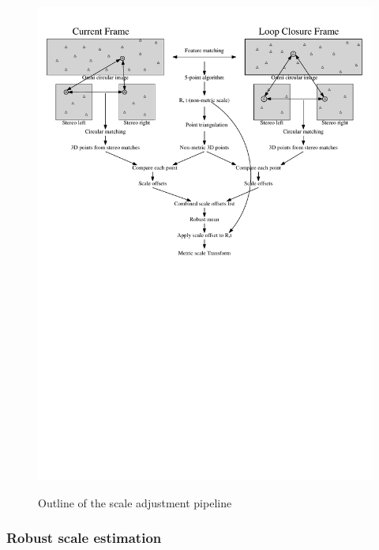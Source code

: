 \begin{figure}[h]
  \centering
    \includegraphics[width=1.0\textwidth]{chapters/images/6_images_scale_adjust}\\
  \caption{Outline of the scale adjustment pipeline}
  \label{fig:scale_adjust_flowchart}
\end{figure}

\subsubsection{Robust scale estimation}

